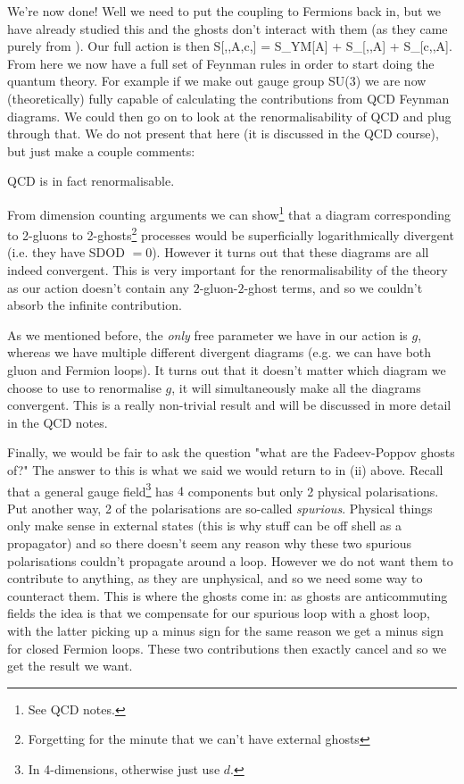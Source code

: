 We're now done! Well we need to put the coupling to Fermions back in, but we have already studied this and the ghosts don't interact with them (as they came purely from ). Our full action is then 
\bse 
    S[\psi,\overline{\psi},A,c,] = S_{YM}[A] + S_{}[\psi,\overline{\psi},A] + S_{}[c,,A].
\ese 
From here we now have a full set of Feynman rules in order to start doing the quantum theory. For example if we make out gauge group SU($3$) we are now (theoretically) fully capable of calculating the contributions from QCD Feynman diagrams. We could then go on to look at the renormalisability of QCD and plug through that. We do not present that here (it is discussed in the QCD course), but just make a couple comments:
\ben[label=(\roman*)]
    \item QCD is in fact renormalisable. 
    \item From dimension counting arguments we can show\footnote{See QCD notes.} that a diagram corresponding to 2-gluons to 2-ghosts\footnote{Forgetting for the minute that we can't have external ghosts} processes would be superficially logarithmically divergent (i.e. they have SDOD $= 0$). However it turns out that these diagrams are all indeed convergent. This is very important for the renormalisability of the theory as our action doesn't contain any $2$-gluon-$2$-ghost terms, and so we couldn't absorb the infinite contribution. 
    \item As we mentioned before, the \textit{only} free parameter we have in our action is $g$, whereas we have multiple different divergent diagrams (e.g. we can have both gluon and Fermion loops). It turns out that it doesn't matter which diagram we choose to use to renormalise $g$, it will simultaneously make all the diagrams convergent. This is a really non-trivial result and will be discussed in more detail in the QCD notes. 
    \item Finally, we would be fair to ask the question "what are the Fadeev-Poppov ghosts of?" The answer to this is what we said we would return to in (ii) above. Recall that a general gauge field\footnote{In 4-dimensions, otherwise just use $d$.} has $4$ components but only 2 physical polarisations. Put another way, 2 of the polarisations are so-called \textit{spurious}. Physical things only make sense in external states (this is why stuff can be off shell as a propagator) and so there doesn't seem any reason why these two spurious polarisations couldn't propagate around a loop. However we do not want them to contribute to anything, as they are unphysical, and so we need some way to counteract them. This is where the ghosts come in: as ghosts are anticommuting fields the idea is that we compensate for our spurious loop with a ghost loop, with the latter picking up a minus sign for the same reason we get a minus sign for closed Fermion loops. These two contributions then exactly cancel and so we get the result we want. 
\een 

